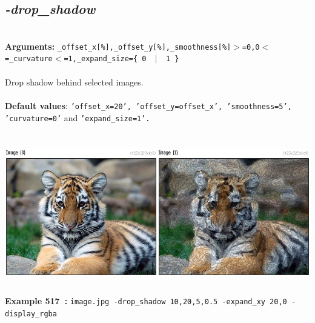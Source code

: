 \documentclass[a4paper,11pt,twoside]{book}
\begin{document}
\subsection{\emph{-drop\_shadow} }\vspace*{-0.5em}
~\\\textbf{Arguments: } 
{\small \texttt{\_offset\_x[\%],\_offset\_y[\%],\_smoothness[\%]$>$=0,0$<$=\_curvature$<$=1,\_expand\_size=\{ 0 ~$|$~ 1 \}}}\\~\\
Drop shadow behind selected images.
~\\~\\\textbf{Default values}: {\small \texttt{'offset\_x=20', 'offset\_y=offset\_x', 'smoothness=5', 'curvature=0'} and \texttt{'expand\_size=1'.}}
\begin{center}\includegraphics[keepaspectratio=true,height=7cm,width=\textwidth]{img/gmic_def517.jpg}\\
{\footnotesize \textbf{Example 517~:} \texttt{image.jpg -drop\_shadow 10,20,5,0.5 -expand\_xy 20,0 -display\_rgba}}
\end{center}
\end{document}
